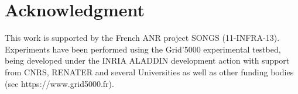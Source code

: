 \section{Acknowledgment}

This work is supported by the French ANR project SONGS (11-INFRA-13).
Experiments have been performed using the Grid'5000 experimental
testbed, being developed under the INRIA ALADDIN development action
with support from CNRS, RENATER and several Universities as well as
other funding bodies (see https://www.grid5000.fr).


